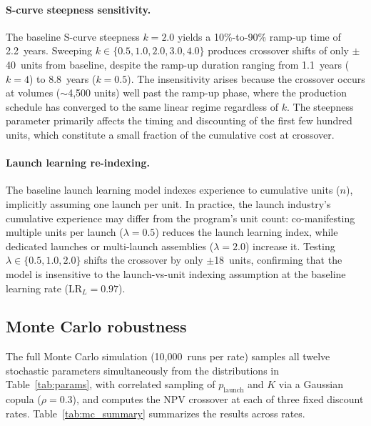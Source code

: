 \documentclass[preprint,12pt]{elsarticle}
\begin{document}
\paragraph{S-curve steepness sensitivity.} The baseline S-curve steepness $k = 2.0$ yields a 10\%-to-90\% ramp-up time of 2.2~years. Sweeping $k \in \{0.5, 1.0, 2.0, 3.0, 4.0\}$ produces crossover shifts of only $\pm$40~units from baseline, despite the ramp-up duration ranging from 1.1~years ($k = 4$) to 8.8~years ($k = 0.5$). The insensitivity arises because the crossover occurs at volumes ($\sim$4{,}500 units) well past the ramp-up phase, where the production schedule has converged to the same linear regime regardless of $k$. The steepness parameter primarily affects the timing and discounting of the first few hundred units, which constitute a small fraction of the cumulative cost at crossover.

\paragraph{Launch learning re-indexing.} The baseline launch learning model indexes experience to cumulative units ($n$), implicitly assuming one launch per unit. In practice, the launch industry's cumulative experience may differ from the program's unit count: co-manifesting multiple units per launch ($\lambda = 0.5$) reduces the launch learning index, while dedicated launches or multi-launch assemblies ($\lambda = 2.0$) increase it. Testing $\lambda \in \{0.5, 1.0, 2.0\}$ shifts the crossover by only $\pm$18~units, confirming that the model is insensitive to the launch-vs-unit indexing assumption at the baseline learning rate ($\mathrm{LR}_L = 0.97$).

\subsection{Monte Carlo robustness}
\label{sec:mc_robustness}

The full Monte Carlo simulation (10{,}000~runs per rate) samples all twelve stochastic parameters simultaneously from the distributions in Table~\ref{tab:params}, with correlated sampling of $p_{\mathrm{launch}}$ and $K$ via a Gaussian copula ($\rho = 0.3$), and computes the NPV crossover at each of three fixed discount rates. Table~\ref{tab:mc_summary} summarizes the results across rates.
\end{document}
